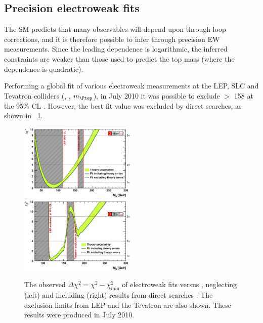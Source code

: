 \subsection{Precision electroweak fits}
\label{sec:prior_constraints:ew_fits}

The \ac{SM} predicts that many observables will depend upon \mH through loop corrections,
and it is therefore possible to infer \mH through precision \ac{EW} measurements. Since 
the leading \mH dependence is logarithmic, the inferred constraints are weaker than those
used to predict the top mass (where the dependence is quadratic).

Performing a global fit of various electroweak measurements at the \acs{LEP}, SLC and
Tevatron colliders (\eg \mW, \mZ, $m_{\Ptop}$), in July 2010 it was possible to exclude 
\mH $>$ \unit{158}{\GeV} at the 95\% \ac{CL} \cite{Gfitter:2008}. However, the best fit 
value was excluded by direct searches, as shown in \Figure~\ref{fig:ewfit}.

\begin{figure}
	\includegraphics[width=0.495\textwidth]{tex/motivation/ewfit_nodirect}
	\hfill
	\includegraphics[width=0.495\textwidth]{tex/motivation/ewfit_withdirect}
	\caption{The observed $\Delta\chi^2 = \chi^2 - \chi^2_{\min}$ of electroweak fits 
	versus \mH, neglecting (left) and including (right) results from direct searches
	\cite{Gfitter:2008}. The exclusion limits from LEP and the Tevatron are also shown.
	These results were produced in July 2010.}
	\label{fig:ewfit}
\end{figure}

